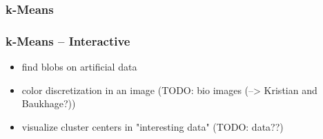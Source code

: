 \begin{frame}
    \frametitle{k-Means}

    
\end{frame}

\begin{frame}
    \frametitle{k-Means -- Interactive}
    \begin{itemize}
        \item  find blobs on artificial data
        \item  color discretization in an image (TODO: bio images (--> Kristian and Baukhage?))
        \item  visualize cluster centers in "interesting data" (TODO: data??)
    \end{itemize}
\end{frame}

